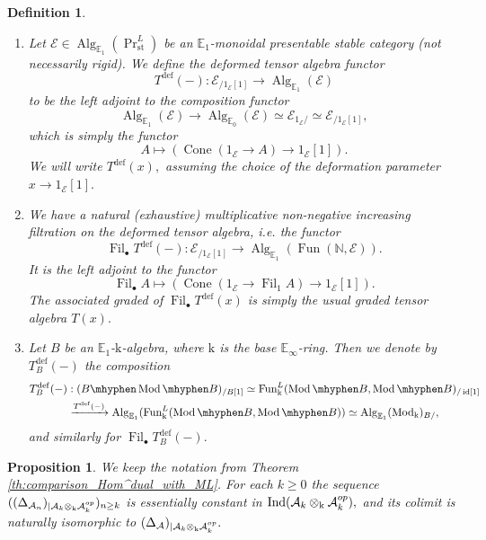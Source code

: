 \documentclass[11pt,leqno]{amsart}
\newtheorem{defi}[theo]{Definition}
\newtheorem{prop}[theo]{Proposition}
\numberwithin{equation}{section}
\def\N{\mathbb{N}}
\newcommand{\tens}[1]{%
  \mathbin{\mathop{\otimes}\displaylimits_{#1}}%
}
\newcommand{\hy}{\mhyphen}
\newcommand{\xto}{\xrightarrow}
\newcommand{\Cone}{\operatorname{Cone}}
\newcommand{\st}{\operatorname{st}}
\newcommand{\deff}{\operatorname{def}}
\newcommand{\Fil}{\operatorname{Fil}}
\newcommand{\bE}{{\mathbb E}}
\newcommand{\mk}{\mathrm k}
\newcommand{\cA}{{\mathcal A}}
\newcommand{\cE}{{\mathcal E}}
\newcommand{\Fun}{\operatorname{Fun}}
\newcommand{\Ind}{\operatorname{Ind}}
\newcommand{\Alg}{\operatorname{Alg}}
\newcommand{\id}{\operatorname{id}}
\newcommand{\Mod}{\operatorname{Mod}}
\begin{document}
\begin{defi}\label{def:deformed_tensor_algebra}
\begin{enumerate}[label=(\roman*),ref=(\roman*)]
\item Let $\cE\in\Alg_{\bE_1}(\Pr^L_{\st})$ be an $\bE_1$-monoidal presentable stable category (not necessarily rigid). We define the deformed tensor algebra functor	\begin{equation*}
T^{\deff}(-):\cE_{/1_{\cE}[1]}\to \Alg_{\bE_1}(\cE)
\end{equation*}
to be the left adjoint to the composition functor
\begin{equation*}
	\Alg_{\bE_1}(\cE)\to \Alg_{\bE_0}(\cE)\simeq \cE_{1_{\cE}/}\simeq \cE_{/1_{\cE}[1]},
\end{equation*}
which is simply the functor
\begin{equation*}
 A\mapsto (\Cone(1_{\cE}\to A)\to 1_{\cE}[1]).
\end{equation*}
We will write $T^{\deff}(x),$ assuming the choice of the deformation parameter $x\to 1_{\cE}[1].$ 
\item We have a natural (exhaustive) multiplicative non-negative increasing filtration on the deformed tensor algebra, i.e. the functor
\begin{equation*}
\Fil_{\bullet}T^{\deff}(-):\cE_{/1_{\cE}[1]}\to \Alg_{\bE_1}(\Fun(\N,\cE)).
\end{equation*}
It is the left adjoint to the functor
\begin{equation*}
\Fil_{\bullet}A\mapsto (\Cone(1_{\cE}\to \Fil_1 A)\to 1_{\cE}[1]). 
\end{equation*}
The associated graded of $\Fil_{\bullet}T^{\deff}(x)$ is simply the usual graded tensor algebra $T(x).$
\item 
Let $B$ be an $\bE_1$-$\mk$-algebra, where $\mk$ is the base $\bE_{\infty}$-ring. Then we denote by $T_B^{\deff}(-)$ the composition
\begin{multline*}
T_B^{\deff}(-):(B\hy\Mod\hy B)_{/B[1]}\simeq \Fun^L_{\mk}(\Mod\hy B,\Mod\hy B)_{/\id[1]}\\
\xto{T^{\deff}(-)}\Alg_{\bE_1}(\Fun^L_{\mk}(\Mod\hy B,\Mod\hy B))\simeq \Alg_{\bE_1}(\Mod_{\mk})_{B/},
\end{multline*} 
and similarly for $\Fil_{\bullet}T_{B}^{\deff}(-).$
\end{enumerate}
\end{defi}

\begin{prop}\label{prop:diag_bimodules_ess_const} We keep the notation from Theorem \ref{th:comparison_Hom^dual_with_ML}. For each $k\geq 0$ the sequence $((\Delta_{\cA_n})_{\mid\cA_k\tens{\mk}\cA_k^{op}})_{n\geq k}$ is essentially constant in $\Ind(\cA_k\tens{\mk}\cA_k^{op}),$ and its colimit is naturally isomorphic to $(\Delta_{\cA})_{\mid \cA_k\tens{\mk}\cA_k^{op}}.$\end{prop}
\end{document}
